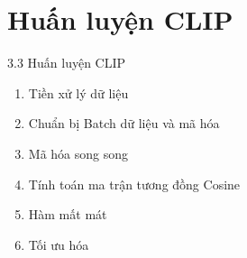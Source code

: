 \section{Huấn luyện CLIP}

\begin{frame}{3.3 Huấn luyện CLIP}
    \begin{enumerate}
        \item Tiền xử lý dữ liệu
        \item Chuẩn bị Batch dữ liệu và mã hóa
        \item Mã hóa song song
        \item Tính toán ma trận tương đồng Cosine
        \item Hàm mất mát
        \item Tối ưu hóa
    \end{enumerate}
\end{frame}





